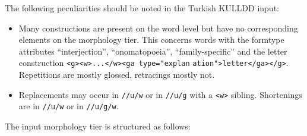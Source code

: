 \documentclass[a4paper, 11pt]{book}
\begin{document}
\noindent The following peculiarities should be noted in the Turkish KULLDD input:

\begin{itemize}
	\item Many constructions are present on the word level but have no corresponding elements on the morphology tier. 
		This concerns words with the formtype attributes “interjection”, “onomatopoeia”, “family-specific” and the 
		letter construction \texttt{<g><w>...</w><ga type="explan} \texttt{ation"}\texttt{>letter</ga></g>}. Repetitions
		are mostly glossed, retracings mostly not.
	\item Replacements may occur in \texttt{//u/w} or in \texttt{//u/g} with a \texttt{<w>} sibling.
		Shortenings are in \texttt{//u/w} or in \texttt{//u/g/w}.
\end{itemize}


\noindent The input morphology tier is structured as follows: 
\end{document}
